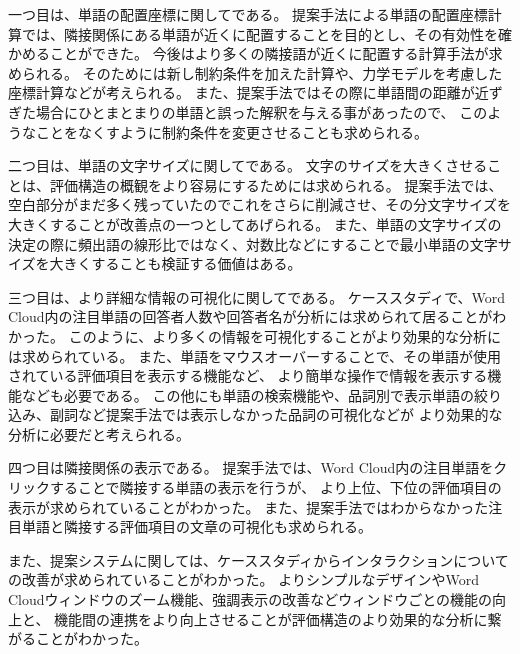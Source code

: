 \documentclass[syuuron]{kuee}
\begin{document}
		一つ目は、単語の配置座標に関してである。
		提案手法による単語の配置座標計算では、隣接関係にある単語が近くに配置することを目的とし、その有効性を確かめることができた。
		今後はより多くの隣接語が近くに配置する計算手法が求められる。
		そのためには新し制約条件を加えた計算や、力学モデルを考慮した座標計算などが考えられる。
		また、提案手法ではその際に単語間の距離が近ずぎた場合にひとまとまりの単語と誤った解釈を与える事があったので、
		このようなことをなくすように制約条件を変更させることも求められる。
		
		二つ目は、単語の文字サイズに関してである。
		文字のサイズを大きくさせることは、評価構造の概観をより容易にするためには求められる。
		提案手法では、空白部分がまだ多く残っていたのでこれをさらに削減させ、その分文字サイズを大きくすることが改善点の一つとしてあげられる。
		また、単語の文字サイズの決定の際に頻出語の線形比ではなく、対数比などにすることで最小単語の文字サイズを大きくすることも検証する価値はある。
		
		三つ目は、より詳細な情報の可視化に関してである。
		ケーススタディで、Word Cloud内の注目単語の回答者人数や回答者名が分析には求められて居ることがわかった。
		このように、より多くの情報を可視化することがより効果的な分析には求められている。
		また、単語をマウスオーバーすることで、その単語が使用されている評価項目を表示する機能など、
		より簡単な操作で情報を表示する機能なども必要である。
		この他にも単語の検索機能や、品詞別で表示単語の絞り込み、副詞など提案手法では表示しなかった品詞の可視化などが
		より効果的な分析に必要だと考えられる。
		
		四つ目は隣接関係の表示である。
		提案手法では、Word Cloud内の注目単語をクリックすることで隣接する単語の表示を行うが、
		より上位、下位の評価項目の表示が求められていることがわかった。
		また、提案手法ではわからなかった注目単語と隣接する評価項目の文章の可視化も求められる。
		
		また、提案システムに関しては、ケーススタディからインタラクションについての改善が求められていることがわかった。
		よりシンプルなデザインやWord Cloudウィンドウのズーム機能、強調表示の改善などウィンドウごとの機能の向上と、
		機能間の連携をより向上させることが評価構造のより効果的な分析に繋がることがわかった。
			
		

		
\end{document}
